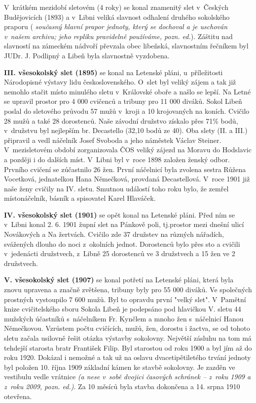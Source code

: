 \documentclass[a5paper, 12pt, twoside]{article}
\newcommand{\pozned}[1]{%
\textit{#1}}
\begin{document}
V~krátkém mezidobí sletovém (4 roky) se konal znamenitý slet v~Českých Budějovicích (1893) a v~Libni veliká slavnost odhalení druhého sokolského praporu (\pozned{současný hlavní prapor jednoty, který se dochoval a je uschován v~našem archivu; jeho repliku pravidelně používáme, pozn. ed.}). Záštitu nad slavností na zámeckém nádvoří převzala obec libeňská, slavnostním řečníkem byl JUDr. J. Podlipný a Libeň byla slavnostně vyzdobena.


\textbf{III. všesokolský slet (1895)} se konal na Letenské pláni, u~příležitosti Národopisné výstavy lidu československého. O~slet byl veliký zájem a tak již nemohlo stačit místo minulého sletu v~Královské oboře a našlo se lepší. Na Letné se upravil prostor pro 4 000 cvičenců a tribuny pro 11 000 diváků. Sokol Libeň poslal do sletového průvodu 57 mužů v~kroji a 10 krojovaných na koních. Cvičilo 28 mužů a také 28 dorostenců. Naše závodní družstvo získalo přes 71\% bodů, v~družstvu byl nejlepším br. Decastello (32,10 bodů ze 40). Oba slety (II. a III.) připravil a vedl náčelník Josef Svoboda a jeho náměstek Václav Steiner. V~mezisletovém období zorganizovala ČOS veliký zájezd na Moravu do Hodslavic a později i do dalších míst. V~Libni byl v~roce 1898 založen ženský odbor. Prvního cvičení se zúčastnilo 26 žen. První náčelnicí byla zvolena sestra Růžena Vocetková, jednatelkou Hana Němečková, provdaná Decastellová. V~roce 1901 již naše ženy cvičily na IV. sletu. Smutnou událostí toho roku bylo, že zemřel místonáčelník, básník a spisovatel Karel Hlaváček.


\textbf{IV. všesokolský slet (1901)} se opět konal na Letenské pláni. Před ním se v~Libni konal 2. 6. 1901 župní slet na Pánkově poli, tj.prostor mezi dnešní ulicí Novákových a Na žertvách. Cvičilo zde 37 družstev na různých nářadích, svážených dlouho do noci z~okolních jednot. Dorostenců bylo přes sto a cvičili v~jedenácti družstvech, z~Libně 25 dorostenců ve 3 družstvech a 15 žen ve 2 družstvech.


\textbf{V. všesokolský slet (1907)} se konal potřetí na Letenské pláni, která byla znovu upravena a značně zvětšena, tribuny byly pro 55 000 diváků. Ve společných prostných vystoupilo 7 600 mužů. Byl to opravdu první "velký slet". V~Pamětní knize cvičitelského sboru Sokola Libeň je podepsáno pod hlavičkou V. sletu 44 mužských účastníků s~náčelníkem Fr. Kynčlem a mnoho žen s~náčelnicí Hanou Němečkovou. Vzrůstem počtu cvičících, mužů, žen, dorostu i žactva, se od tohoto sletu začala usilovně řešit otázka výstavby sokolovny. Největší zásluhu na tom má tehdejší starosta bratr František Filip. Byl starostou od roku 1900 a byl jím až do roku 1920. Dokázal i nemožné a tak už na oslavu dvacetipětiletého trvání jednoty byl položen 10. října 1909 základní kámen ke stavbě sokolovny. Je zazděn ve vestibulu vedle vrátnice \pozned{(a nese v~sobě dvojici časových schránek – z~roku 1909 a z~roku 2009, pozn. ed.)}. Za 10 měsíců byla stavba dokončena a 14. srpna 1910 otevřena.
\end{document}
